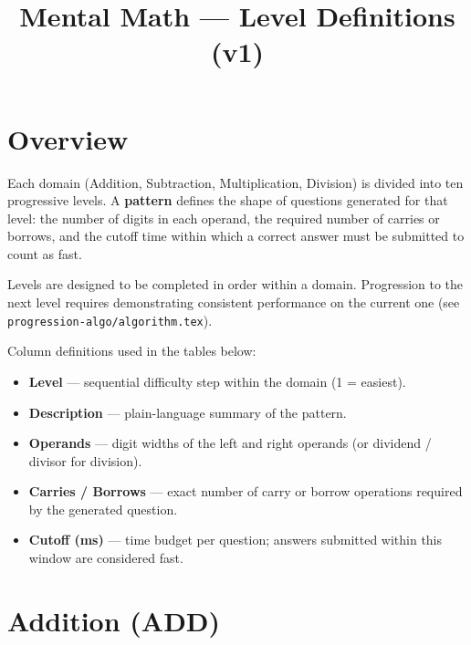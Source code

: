 \documentclass[11pt]{article}
\title{Mental Math --- Level Definitions (v1)}
\date{}
\begin{document}
\maketitle

\section{Overview}

Each domain (Addition, Subtraction, Multiplication, Division) is divided into ten progressive levels.
A \textbf{pattern} defines the shape of questions generated for that level: the number of digits in each
operand, the required number of carries or borrows, and the cutoff time within which a correct answer
must be submitted to count as fast.

Levels are designed to be completed in order within a domain. Progression to the next level requires
demonstrating consistent performance on the current one (see \texttt{progression-algo/algorithm.tex}).

\bigskip
\noindent Column definitions used in the tables below:

\begin{itemize}[leftmargin=*]
  \item \textbf{Level} --- sequential difficulty step within the domain (1 = easiest).
  \item \textbf{Description} --- plain-language summary of the pattern.
  \item \textbf{Operands} --- digit widths of the left and right operands (or dividend / divisor for division).
  \item \textbf{Carries / Borrows} --- exact number of carry or borrow operations required by the generated question.
  \item \textbf{Cutoff (ms)} --- time budget per question; answers submitted within this window are considered fast.
\end{itemize}

\section{Addition (ADD)}
\end{document}
